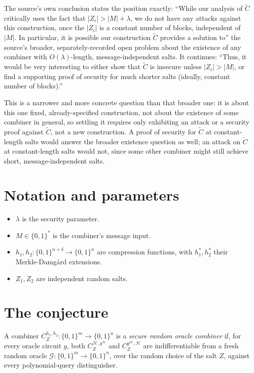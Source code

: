 \documentclass{aicr-conjecture}
\newcommand{\Z}{Z}
\newcommand{\Ctil}{\widetilde{C}}
\begin{document}
The source's own conclusion states the position exactly: ``While our
analysis of $\Ctil$ critically uses the fact that $|\Z_{i}| > |M| +
\lambda$, we do not have any attacks against this construction, once
the $|\Z_{i}|$ is a constant number of blocks, independent of $|M|$. In
particular, it is possible our construction $\Ctil$ provides a
solution to'' the source's broader, separately-recorded open problem
about the existence of any combiner with $O(\lambda)$-length,
message-independent salts. It continues: ``Thus, it would be very
interesting to either show that $\Ctil$ is insecure unless $|\Z_{i}| >
|M|$, or find a supporting proof of security for much shorter salts
(ideally, constant number of blocks).''

This is a narrower and more concrete question than that broader one: it
is about this one fixed, already-specified construction, not about the
existence of some combiner in general, so settling it requires only
exhibiting an attack or a security proof against $\Ctil$, not a new
construction. A proof of security for $\Ctil$ at constant-length salts
would answer the broader existence question as well; an attack on
$\Ctil$ at constant-length salts would not, since some other combiner
might still achieve short, message-independent salts.

\section{Notation and parameters}\label{sec:notation}

\begin{itemize}[nosep]
  \item $\lambda$ is the security parameter.
  \item $M \in \{0,1\}^{*}$ is the combiner's message input.
  \item $h_{1}, h_{2} : \{0,1\}^{n+\delta} \to \{0,1\}^{n}$ are
    compression functions, with $h_{1}^{*}, h_{2}^{*}$ their
    Merkle-Damg\r{a}rd extensions.
  \item $\Z_{1}, \Z_{2}$ are independent random salts.
\end{itemize}

\section{The conjecture}\label{sec:conjectures}

\begin{definition}\label{def:roc}
A combiner $C^{h_{1},h_{2}}_{\Z} : \{0,1\}^{m} \to \{0,1\}^{n}$ is a
\emph{secure random oracle combiner} if, for every oracle circuit $g$,
both $C^{\mathcal{H}, g^{\mathcal{H}}}_{\Z}$ and $C^{g^{\mathcal{H}},
\mathcal{H}}_{\Z}$ are indifferentiable from a fresh random oracle
$\mathcal{G} : \{0,1\}^{m} \to \{0,1\}^{n}$, over the random choice of
the salt $\Z$, against every polynomial-query distinguisher.
\end{definition}
\end{document}
